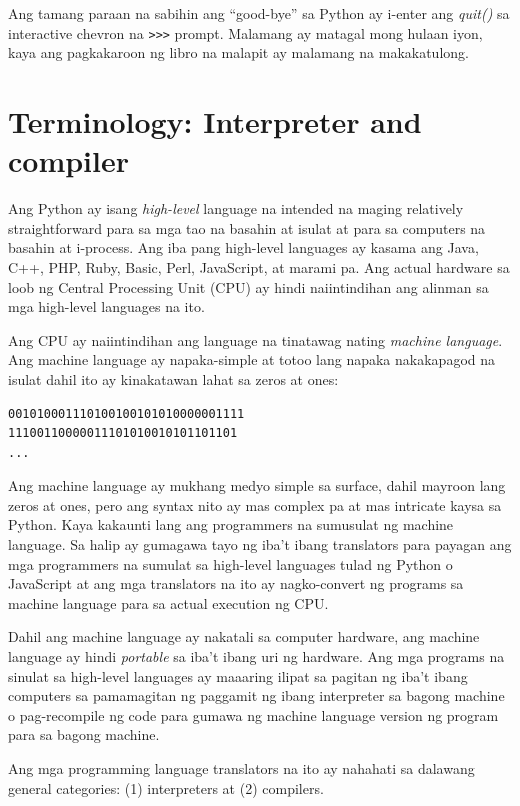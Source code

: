 \documentclass[10pt,]{book}
\begin{document}
Ang tamang paraan na sabihin ang ``good-bye'' sa Python ay i-enter ang
\emph{quit()} sa interactive chevron na
\texttt{\textgreater{}\textgreater{}\textgreater{}} prompt. Malamang ay
matagal mong hulaan iyon, kaya ang pagkakaroon ng libro na malapit ay
malamang na makakatulong.

\section{Terminology: Interpreter and
compiler}\label{terminology-interpreter-and-compiler}

Ang Python ay isang \emph{high-level} language na intended na maging
relatively straightforward para sa mga tao na basahin at isulat at para
sa computers na basahin at i-process. Ang iba pang high-level languages
ay kasama ang Java, C++, PHP, Ruby, Basic, Perl, JavaScript, at marami
pa. Ang actual hardware sa loob ng Central Processing Unit (CPU) ay
hindi naiintindihan ang alinman sa mga high-level languages na ito.

Ang CPU ay naiintindihan ang language na tinatawag nating \emph{machine
language}. Ang machine language ay napaka-simple at totoo lang napaka
nakakapagod na isulat dahil ito ay kinakatawan lahat sa zeros at ones:

{\small
\begin{verbatim}
001010001110100100101010000001111
11100110000011101010010101101101
...
\end{verbatim}
}

Ang machine language ay mukhang medyo simple sa surface, dahil mayroon
lang zeros at ones, pero ang syntax nito ay mas complex pa at mas
intricate kaysa sa Python. Kaya kakaunti lang ang programmers na
sumusulat ng machine language. Sa halip ay gumagawa tayo ng iba't ibang
translators para payagan ang mga programmers na sumulat sa high-level
languages tulad ng Python o JavaScript at ang mga translators na ito ay
nagko-convert ng programs sa machine language para sa actual execution
ng CPU.

Dahil ang machine language ay nakatali sa computer hardware, ang machine
language ay hindi \emph{portable} sa iba't ibang uri ng hardware. Ang
mga programs na sinulat sa high-level languages ay maaaring ilipat sa
pagitan ng iba't ibang computers sa pamamagitan ng paggamit ng ibang
interpreter sa bagong machine o pag-recompile ng code para gumawa ng
machine language version ng program para sa bagong machine.

Ang mga programming language translators na ito ay nahahati sa dalawang
general categories: (1) interpreters at (2) compilers.
\end{document}
